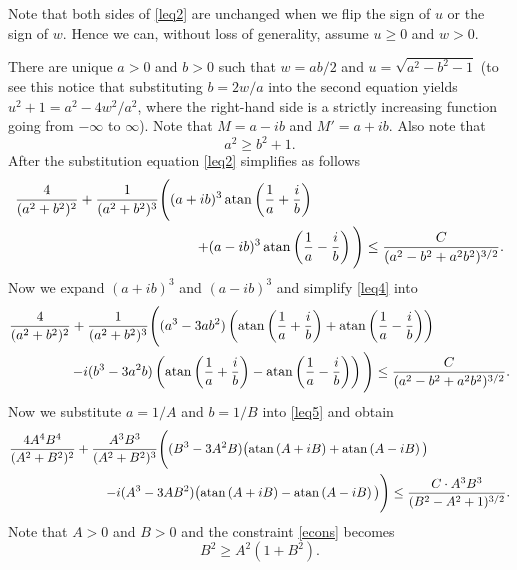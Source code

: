 \documentclass[11pt]{article}
\def\({\left(} \def\){\right)} \def\hatU{\widehat{U}}
\begin{document}
Note that both sides of \eqref{leq2} are unchanged when we flip the sign of $u$ or the sign of $w$.
Hence we can, without loss of generality, assume $u\geq 0$ and $w>0$.

There are unique $a>0$ and $b>0$ such that $w=ab/2$ and $u=\sqrt{a^2-b^2-1}$ (to see this
notice that substituting $b=2w/a$ into the second equation yields $u^2+1 = a^2 - 4w^2/a^2$,
where the right-hand side is a strictly increasing function going from $-\infty$ to $\infty$).
Note that $M=a-ib$ and $M'=a+ib$. Also note that
\begin{equation}\label{econs}
a^2\geq b^2 + 1.
\end{equation}
After the substitution equation \eqref{leq2} simplifies as follows
\begin{equation}\label{leq4}
\begin{split}
\frac{4}{(a^2+b^2)^2}+\frac{1}{(a^2+b^2)^3}\Bigg(
(a+ib)^3\,{\rm atan}\(\frac{1}{a}+\frac{i}{b}\)\phantom{XXXXXXXXXXXXXXX}\\
+(a-ib)^3\,{\rm atan}\(\frac{1}{a}-\frac{i}{b}\)
\Bigg)
\leq \frac{C}{(a^2-b^2+a^2b^2)^{3/2}}.
\end{split}
\end{equation}
Now we expand $(a+ib)^3$ and $(a-ib)^3$ and simplify \eqref{leq4} into
\begin{equation}\label{leq5}
\begin{split}
\frac{4}{(a^2+b^2)^2}+\frac{1}{(a^2+b^2)^3}\Bigg(
(a^3-3ab^2)\({\rm atan}\(\frac{1}{a}+\frac{i}{b}\)+{\rm atan}\(\frac{1}{a}-\frac{i}{b}\)\)\phantom{XXXXXX}\\
-i(b^3-3a^2b)\({\rm atan}\(\frac{1}{a}+\frac{i}{b}\)-{\rm atan}\(\frac{1}{a}-\frac{i}{b}\)\)
\Bigg)
\leq \frac{C}{(a^2-b^2+a^2b^2)^{3/2}}.
\end{split}
\end{equation}
Now we substitute $a=1/A$ and $b=1/B$ into \eqref{leq5} and obtain
\begin{equation}\label{leq6}
\begin{split}
\frac{4A^4B^4}{(A^2+B^2)^2}+\frac{A^3B^3}{(A^2+B^2)^3}\Bigg(
(B^3-3A^2B)\big({\rm atan}\(A+iB\)+{\rm atan}\(A-iB\)\big)\phantom{XXXXXXX}\\
-i(A^3-3AB^2)\big({\rm atan}\(A+iB\)-{\rm atan}\(A-iB\)\big)
\Bigg)
\leq \frac{C\cdot A^3B^3}{(B^2-A^2+1)^{3/2}}.
\end{split}
\end{equation}
Note that $A>0$ and $B>0$ and the constraint \eqref{econs} becomes
\begin{equation}\label{econs2}
B^2\geq A^2(1+B^2).
\end{equation}
\end{document}
